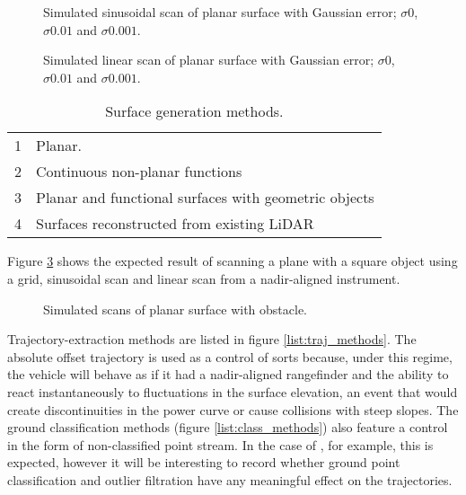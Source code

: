 \documentclass[10pt]{report}
\begin{document}
\begin{figure}
\centering
\def\svgscale{0.25}

\def\svgscale{0.25}

\def\svgscale{0.25}

\caption{Simulated sinusoidal scan of planar surface with Gaussian error; $\sigma 0$, $\sigma 0.01$ and $\sigma 0.001$.}
\label{fig:sinus_plane}
\end{figure}

\begin{figure}
\centering
\def\svgscale{0.25}

\def\svgscale{0.25}

\def\svgscale{0.25}

\caption{Simulated linear scan of planar surface with Gaussian error; $\sigma 0$, $\sigma 0.01$ and $\sigma 0.001$.}
\label{fig:linear_plane}
\end{figure}

\begin{table}
\caption{Surface generation methods.}
\label{list:ground_types}
\begin{tabular}{r | l}
\hline
1 & Planar. \\
2 & Continuous non-planar functions \\
3 & Planar and functional surfaces with geometric objects \\
4 & Surfaces reconstructed from existing LiDAR \\
\hline
\end{tabular}
\end{table}

Figure \ref{fig:plane_object} shows the expected result of scanning a plane with a square object using a grid, sinusoidal scan and linear scan from a nadir-aligned instrument.

\begin{figure}
\centering
\def\svgscale{0.25}

\def\svgscale{0.25}

\def\svgscale{0.25}

\caption{Simulated scans of planar surface with obstacle.}
\label{fig:plane_object}
\end{figure}


Trajectory-extraction methods are listed in figure \ref{list:traj_methods}. The absolute offset trajectory is used as a control of sorts because, under this regime, the vehicle will behave as if it had a nadir-aligned rangefinder and the ability to react instantaneously to fluctuations in the surface elevation, an event that would create discontinuities in the power curve or cause collisions with steep slopes. The ground classification methods  (figure \ref{list:class_methods}) also feature a control in the form of non-classified point stream. In the case of \cite{Alqahtani2018}, for example, this is expected, however it will be interesting to record whether ground point classification and outlier filtration have any meaningful effect on the trajectories.
\end{document}
